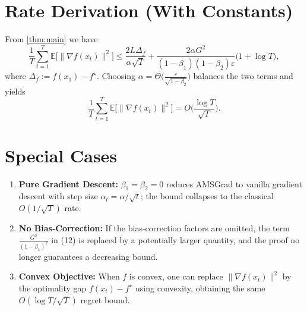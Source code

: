 \documentclass[11pt]{article}
\begin{document}
\section*{Rate Derivation (With Constants)}
From \eqref{thm:main} we have
\[
\boxed{
\frac{1}{T}\sum_{t=1}^{T}\mathbb{E}\big[\|\nabla f(x_t)\|^{2}\big]
\le
\frac{2L\Delta_f}{\alpha\sqrt{T}}
+\frac{2\alpha G^{2}}{(1-\beta_1)(1-\beta_2)\varepsilon}\big(1+\log T\big)
},
\]
where $\Delta_f:=f(x_1)-f^\star$.  
Choosing $\alpha=\Theta\big(\frac{\varepsilon}{\sqrt{1-\beta_2}}\big)$ balances the two terms and yields
\[
\frac{1}{T}\sum_{t=1}^{T}\mathbb{E}\big[\|\nabla f(x_t)\|^{2}\big]
=O\!\Big(\frac{\log T}{\sqrt{T}}\Big).
\]

\section*{Special Cases}
\begin{enumerate}[label=\alph*.]
\item \textbf{Pure Gradient Descent:} $\beta_1=\beta_2=0$ reduces AMSGrad to vanilla gradient descent with step size $\alpha_t=\alpha/\sqrt{t}$; the bound collapses to the classical $O(1/\sqrt{T})$ rate.
\item \textbf{No Bias‑Correction:} If the bias‑correction factors are omitted, the term $\frac{G^{2}}{(1-\beta_1)^{2}}$ in (12) is replaced by a potentially larger quantity, and the proof no longer guarantees a decreasing bound.
\item \textbf{Convex Objective:} When $f$ is convex, one can replace $\|\nabla f(x_t)\|^{2}$ by the optimality gap $f(x_t)-f^\star$ using convexity, obtaining the same $O(\log T/\sqrt{T})$ regret bound.
\end{enumerate}
\end{document}
